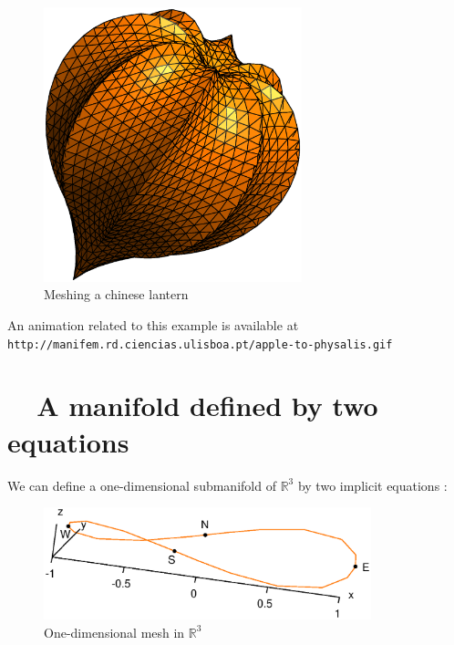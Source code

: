 \begin{figure}[ht] \centering
  \includegraphics[width=75mm]{fisalis}
  \caption{Meshing a chinese lantern}
  \label{\numb section 2.\numb fig 14}
\end{figure}

An animation related to this example is available at\hfil\break
{\small\tt http://manifem.rd.ciencias.ulisboa.pt/apple-to-physalis.gif}


\section{~~A manifold defined by two equations}\label{\numb section 2.\numb parag 12}

We can define a one-dimensional submanifold of $ \mathbb{R}^3 $ by two implicit equations :
\medskip

\begin{figure}[ht] \centering
  \includegraphics[width=95mm]{circle-3d}
  \caption{One-dimensional mesh in $ {\mathbb R}^3 $}
  \label{\numb section 2.\numb fig 15}
\end{figure}

